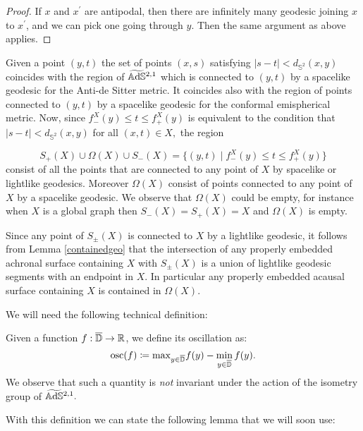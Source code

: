 \begin{proof}
       If $x$ and $x^{\prime}$ are antipodal, then there are infinitely many geodesic joining $x$ to $x^{\prime}$, and we can pick one going through $y$. Then the same argument as above applies. 
\end{proof}

\begin{observation}\label{423}
    Given a point $(y,t)$ the set of points $(x,s)$ satisfying $\lvert s-t \rvert<d_{\mathbb{S}^2}(x,y)$ coincides with the region of $\widetilde{\mathbb{A}\mathrm{d}\mathbb{S}}{}^{2,1}$ which is connected to $(y,t)$ by a spacelike geodesic for the Anti-de Sitter metric. It coincides also with the region of points connected to $(y,t)$ by a spacelike geodesic for the conformal emispherical metric. Now, since $f_-^X(y)\leq t\leq f_+^X(y)$ is equivalent to the condition that $\lvert s-t \rvert<d_{\mathbb{S}^2}(x,y)$ for all $(x,t)\in X,$ the region 

    \[
        S_+(X)\cup\Omega(X)\cup S_-(X)=\{(y,t)\;|\; f_-^X(y)\leq t\leq f_+^X(y)\}
    \]
    consist of all the points that are connected to any point of $X$ by spacelike or lightlike geodesics. Moreover $\Omega(X)$ consist of points connected to any point of $X$ by a spacelike geodesic. We observe that $\Omega(X)$ could be empty, for instance when $X$ is a global graph then $S_-(X)=S_+(X)=X$ and $\Omega(X)$ is empty.
\end{observation}

\begin{observation}
    Since any point of $S_\pm(X)$ is connected to $X$ by a lightlike geodesic, it follows from Lemma \ref{containedgeo} that the intersection of any properly embedded achronal surface containing $X$ with $S_\pm(X)$ is a union of lightlike geodesic segments with an endpoint in $X$. In particular any properly embedded acausal surface containing $X$ is contained in $\Omega(X).$
\end{observation}

We will need the following technical definition: 

\begin{definition}
    Given a function $f:\overline{\mathbb{D}}\to\mathbb{R}$, we define its oscillation as: 
    \[
        \text{osc}(f)\coloneqq \text{max}_{y\in\overline{\mathbb{D}}}f(y)-\min_{y\in\overline{\mathbb{D}}}f(y).
    \]
    We observe that such a quantity is \textit{not} invariant under the action of the isometry group of $\widetilde{\mathbb{A}\mathrm{d}\mathbb{S}}{}^{2,1}.$
\end{definition}

With this definition we can state the following lemma that we will soon use: 

